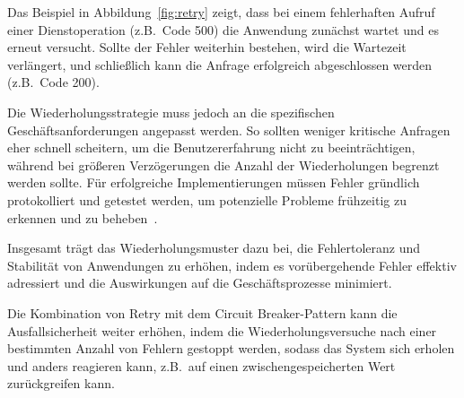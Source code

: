 Das Beispiel in Abbildung~\ref{fig:retry} zeigt, dass bei einem fehlerhaften Aufruf einer Dienstoperation
(z.B.\ Code 500) die Anwendung zunächst wartet und es erneut versucht.
Sollte der Fehler weiterhin bestehen, wird die Wartezeit verlängert, und schließlich
kann die Anfrage erfolgreich abgeschlossen werden (z.B.\ Code 200).

Die Wiederholungsstrategie muss jedoch an die spezifischen Geschäftsanforderungen angepasst werden.
So sollten weniger kritische Anfragen eher schnell scheitern, um die Benutzererfahrung nicht zu beeinträchtigen,
während bei größeren Verzögerungen die Anzahl der Wiederholungen begrenzt werden sollte.
Für erfolgreiche Implementierungen müssen Fehler gründlich protokolliert und getestet werden,
um potenzielle Probleme frühzeitig zu erkennen und zu beheben~\cite{Meheden.2021}.

Insgesamt trägt das Wiederholungsmuster dazu bei, die Fehlertoleranz und Stabilität von Anwendungen zu erhöhen,
indem es vorübergehende Fehler effektiv adressiert und die Auswirkungen auf die Geschäftsprozesse minimiert.

Die Kombination von Retry mit dem Circuit Breaker-Pattern kann die Ausfallsicherheit weiter erhöhen,
indem die Wiederholungsversuche nach einer bestimmten Anzahl von Fehlern gestoppt werden,
sodass das System sich erholen und anders reagieren kann, z.B.\ auf einen zwischengespeicherten Wert zurückgreifen kann.


